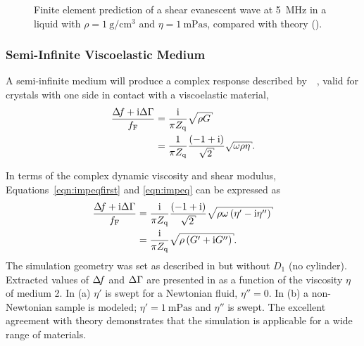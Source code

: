 \begin{figure}[h]
 \centering
{}
\caption{Finite element prediction of a shear evanescent wave at
\SI{5}{\mega\hertz} in a liquid with
$\rho=\SI{1}{\gram\per\centi\meter\cubed}$ and
$\eta=\SI{1}{\milli\pascal\second}$, compared with theory
().}
\label{fig:suppshearwave}
\end{figure}

\subsubsection{Semi-Infinite Viscoelastic Medium}
A semi-infinite medium will produce a complex response described
by~\cite{kanazawa1985frequency}~\cite{martin1991characterization}, valid
for crystals with one side in contact with a viscoelastic material,
\begin{align}
 \frac{\df+\mi\dg}{f_\mathrm{F}}&=\frac{\mi}{\pi Z_\mathrm{q}}\sqrt{\rho G}\label{eqn:impeqfirst}\\
                                &= \frac{1}{\pi
																																								Z_\mathrm{q}}\frac{\left(-1+\mi\right)}{\sqrt{2}}\sqrt{\omega \rho \eta}.
\label{eqn:impeq}
\end{align}

In terms of the complex dynamic viscosity and shear modulus,
Equations~\ref{eqn:impeqfirst} and \ref{eqn:impeq} can be expressed as
\begin{align}
\frac{\df+\mi\Delta\Gamma}{f_{\mathrm{F}}}&=\frac{\mi}{\pi Z_{\mathrm{q}}}
\frac{\left(-1+\mi\right)}{\sqrt{2}}\sqrt{\rho\omega\left(\eta'-\mi\eta''\right)}\\
&=\frac{\mi}{\pi Z_{\mathrm{q}}}\sqrt{\rho\left(G'+\mi G''\right)}.
\label{eqn:viscoshear}
\end{align}
The simulation geometry was set as described in 
but without $D_1$ (no cylinder).  Extracted values of $\Delta\!f$ and $\Delta\Gamma$ are
presented in  as a function of the viscosity $\eta$
of medium 2.  In (a) $\eta'$ is swept for a
Newtonian fluid, $\eta''=0$.  In (b) a non-Newtonian
sample is modeled; $\eta'=\SI{1}{\milli\pascal\second}$ and $\eta''$ is
swept.  The excellent agreement with theory demonstrates that the
simulation is applicable for a wide range of materials.

